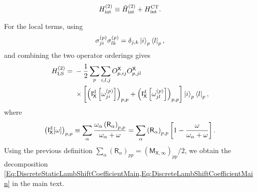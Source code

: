 \documentclass[prx,aps,twocolumn,article]{revtex4-2}
\newcommand{\msf}[1]{\mathsf{#1}}
\newcommand{\msI}{\msf{I}}
\newcommand{\msM}{\msf{M}}
\newcommand{\msX}{\msf{X}}
\newcommand{\msR}{\msf{R}}
\begin{document}
\begin{align}
    H_{\rm int}^{(2)}
    \equiv
    \tilde{H}_{\rm int}^{(2)}
    +
    H_{\mathrm{int}}^{\mathrm{CT}}.
\label{Eq:AppendixSWTotalInteraction}
\end{align}

For the local terms, using
\begin{align}
    \sigma_{ji}^{(p)}
    \sigma_{lk}^{(p)}
    =
    \delta_{j,k}
    \ket{i}_p\bra{l}_p,
\end{align}
and combining the two operator orderings gives
\begin{align}
\begin{aligned}
    H_{\rm LS}^{(2)}
    ={}&
    -\frac12
    \sum_p
    \sum_{i,l,j}
    O_{p,ij}^{\msX}
    O_{p,jl}^{\msX}
    \\
    &\times
    \left[
        \left(
            \msI_{\msX}^{\rm d}
            \left[
                \omega_{ji}^{(p)}
            \right]
        \right)_{p,p}
        +
        \left(
            \msI_{\msX}^{\rm d}
            \left[
                \omega_{jl}^{(p)}
            \right]
        \right)_{p,p}
    \right]
    \ket{i}_p\bra{l}_p,
\end{aligned}
\label{Eq:AppendixSWLocalOperator}
\end{align}
where
\begin{align}
    \left(
        \msI_{\msX}^{\rm d}[\omega]
    \right)_{p,p}
    \equiv
    \sum_\alpha
    \frac{
        \omega_\alpha
        \left(
            \msR_\alpha
        \right)_{p,p}
    }{
        \omega_\alpha+\omega
    }=\sum_{\alpha}\left(\msR_\alpha
        \right)_{p,p}\left[1-\frac{\omega}{\omega_\alpha+\omega}\right].
\label{Eq:DiscreteIKernel}
\end{align}
Using the previous definition $\sum_{\alpha}(\msR_\alpha)_{pp}=(\msM_{\msX,\infty})_{pp}/2$, we obtain the decomposition \cref{Eq:DiscreteStaticLambShiftCoefficientMain,Eq:DiscreteLambShiftCoefficientMain} in the main text.
\end{document}
